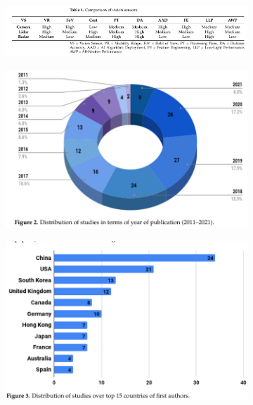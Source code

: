 \begin{figure}[!ht]
    \centering
    \begin{subfigure}{\textwidth}
        \includegraphics[width=1\textwidth]{img/71}\label{fig:71}
    \end{subfigure}
    \begin{subfigure}{0.4\textwidth}
        \includegraphics[width=\textwidth]{img/73}\label{fig:73}
    \end{subfigure}
    \begin{subfigure}{0.4\textwidth}
        \includegraphics[width=\textwidth]{img/74}\label{fig:74}
    \end{subfigure}
\end{figure}
\clearpage

